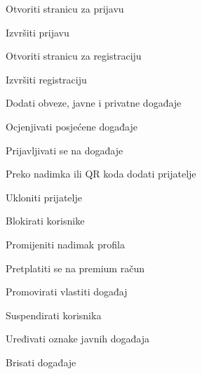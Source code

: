 			
			\begin{packed_enum}
				\item  {}
				
				\begin{packed_enum}
					
					\item 	Otvoriti stranicu za prijavu
					\item   Izvršiti prijavu
					\item 	Otvoriti stranicu za registraciju
					\item   Izvršiti registraciju
					
					
				\end{packed_enum}
			
				\item  {}
				
				\begin{packed_enum}
					
					\item Dodati obveze, javne i privatne događaje
					\item Ocjenjivati posjećene događaje
					\item Prijavljivati se na događaje
					\item Preko nadimka ili QR koda dodati prijatelje
					\item Ukloniti prijatelje
					\item Blokirati korisnike
					\item Promijeniti nadimak profila
					\item Pretplatiti se na premium račun
					
				\end{packed_enum}
			
				\item  {}
				
				\begin{packed_enum}
					
					\item Promovirati vlastiti događaj
			
					
				\end{packed_enum}
			
				\item  {}
				
				\begin{packed_enum}
					
					\item Suspendirati korisnika
					\item Uređivati oznake javnih događaja
					\item Brisati događaje
					

\end{packed_enum}
\end{packed_enum}
